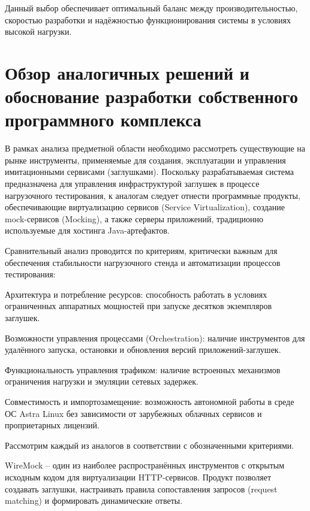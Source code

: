 Данный выбор обеспечивает оптимальный баланс между производительностью, скоростью разработки и надёжностью функционирования системы в условиях высокой нагрузки.

\section{Обзор аналогичных решений и обоснование разработки собственного программного комплекса}

В рамках анализа предметной области необходимо рассмотреть существующие на рынке инструменты, применяемые для создания, эксплуатации и управления имитационными сервисами (заглушками). Поскольку разрабатываемая система предназначена для управления инфраструктурой заглушек в процессе нагрузочного тестирования, к аналогам следует отнести программные продукты, обеспечивающие виртуализацию сервисов (Service Virtualization), создание mock-сервисов (Mocking), а также серверы приложений, традиционно используемые для хостинга Java-артефактов.

Сравнительный анализ проводится по критериям, критически важным для обеспечения стабильности нагрузочного стенда и автоматизации процессов тестирования:

\begin{compactlist}
\item Архитектура и потребление ресурсов: способность работать в условиях ограниченных аппаратных мощностей при запуске десятков экземпляров заглушек.
\item Возможности управления процессами (Orchestration): наличие инструментов для удалённого запуска, остановки и обновления версий приложений-заглушек.
\item Функциональность управления трафиком: наличие встроенных механизмов ограничения нагрузки и эмуляции сетевых задержек.
\item Совместимость и импортозамещение: возможность автономной работы в среде ОС Astra Linux без зависимости от зарубежных облачных сервисов и проприетарных лицензий.
\end{compactlist}

Рассмотрим каждый из аналогов в соответствии с обозначенными критериями.


WireMock -- один из наиболее распространённых инструментов с открытым исходным кодом для виртуализации HTTP-сервисов. Продукт позволяет создавать заглушки, настраивать правила сопоставления запросов (request matching) и формировать динамические ответы.

